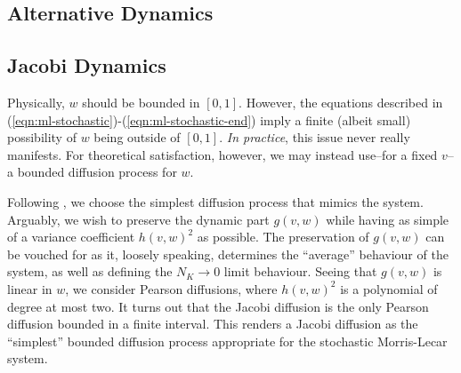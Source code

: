 \documentclass[letterpaper,12pt]{article}
\numberwithin{table}{section}
\numberwithin{figure}{section}
\numberwithin{equation}{section}
\begin{document}
\begin{flushleft}
    \section{Alternative Dynamics}

    \subsection{Jacobi Dynamics}

    Physically, $w$ should be bounded in $[0, 1]$. However, the equations described in (\ref{eqn:ml-stochastic})-(\ref{eqn:ml-stochastic-end}) imply a finite (albeit small) possibility of $w$ being outside of $[0, 1]$. \textit{In practice}, this issue never really manifests. For theoretical satisfaction, however, we may instead use--for a fixed $v$--a bounded diffusion process for $w$.

    Following \cite{dg}, we choose the simplest diffusion process that mimics the system. Arguably, we wish to preserve the dynamic part $g(v, w)$ while having as simple of a variance coefficient $h(v, w)^2$ as possible. The preservation of $g(v, w)$ can be vouched for as it, loosely speaking, determines the ``average'' behaviour of the system, as well as defining the $N_K \to 0$ limit behaviour. Seeing that $g(v, w)$ is linear in $w$, we consider Pearson diffusions, where $h(v, w)^2$ is a polynomial of degree at most two. It turns out that the Jacobi diffusion is the only Pearson diffusion bounded in a finite interval. This renders a Jacobi diffusion as the ``simplest'' bounded diffusion process appropriate for the stochastic Morris-Lecar system.


\end{flushleft}
\end{document}
